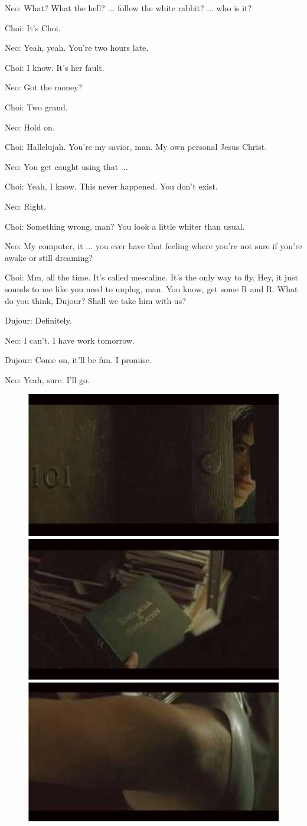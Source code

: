 \documentclass[UTF8]{ctexart}
\newenvironment{myquote}{\color{green} \setlength{\leftskip}{6em} \setlength{\rightskip}{4em} \setlength{\parindent}{-2em}}{\par}
\begin{document}
\begin{myquote}
Neo: What? What the hell? ... follow the white rabbit? ... who is it?

Choi: It's Choi.

Neo: Yeah, yeah. You're two hours late.

Choi: I know. It's her fault.

Neo: Got the money?

Choi: Two grand.

Neo: Hold on.

Choi: Hallelujah. You're my savior, man. My own personal Jesus Christ.

Neo: You get caught using that ...

Choi: Yeah, I know. This never happened. You don't exist.

Neo: Right.

Choi: Something wrong, man? You look a little whiter than usual.

Neo: My computer, it ... you ever have that feeling where you're not sure if you're awake or still dreaming?

Choi: Mm, all the time. It's called mescaline. It's the only way to fly. Hey, it just sounds to me like you need to unplug, man. You know, get some R and R. What do you think, Dujour? Shall we take him with us?

Dujour: Definitely.

Neo: I can't. I have work tomorrow.

Dujour: Come on, it'll be fun. I promise.

Neo: Yeah, sure. I'll go.
\end{myquote}

\begin{figure}[htb]
\centering
\includegraphics[width=0.5\linewidth]{fig/read_Matrix-4}
\includegraphics[width=0.5\linewidth]{fig/read_Matrix-4-1}
\includegraphics[width=0.5\linewidth]{fig/read_Matrix-4-2}
\end{figure}
\end{document}
